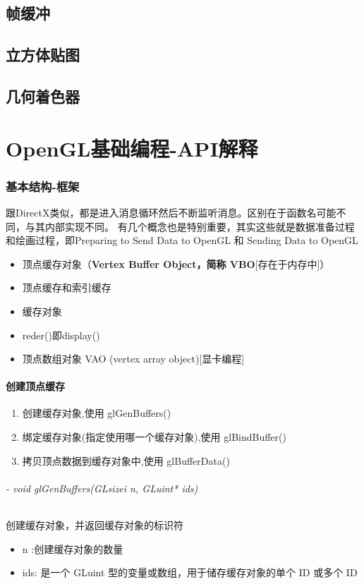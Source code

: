 \documentclass[UTF8,a4paper,12pt]{ctexbook}
\begin{document}
	
	\section{帧缓冲}


	\section{立方体贴图}
	
	
	\section{几何着色器}
			
			
\chapter{OpenGL基础编程-API解释}
	
	\subsection{基本结构-框架}
		跟DirectX类似，都是进入消息循环然后不断监听消息。区别在于函数名可能不同，与其内部实现不同。
		有几个概念也是特别重要，其实这些就是数据准备过程和绘画过程，即Preparing to Send Data to OpenGL 和 Sending Data to OpenGL
		
		\begin{itemize}
			\item  顶点缓存对象（\textbf{Vertex Buffer Object，简称 VBO}[存在于内存中]）
			\item  顶点缓存和索引缓存
			\item  缓存对象
			\item  reder()即display()
			\item 顶点数组对象 VAO (vertex array object)[显卡编程]
		\end{itemize}
		
		\subsubsection{创建顶点缓存}
			\begin{enumerate}
				\item 创建缓存对象,使用 glGenBuffers()
				\item 绑定缓存对象(指定使用哪一个缓存对象),使用 glBindBuffer()
				\item 拷贝顶点数据到缓存对象中,使用 glBufferData()
			\end{enumerate}
			
			\subparagraph{- void glGenBuffers(GLsizei n, GLuint* ids)}创建缓存对象，并返回缓存对象的标识符
				\begin{itemize}
					\item n :创建缓存对象的数量
					\item ids: 是一个 GLuint 型的变量或数组，用于储存缓存对象的单个 ID 或多个 ID
				\end{itemize}
				
\end{document}
